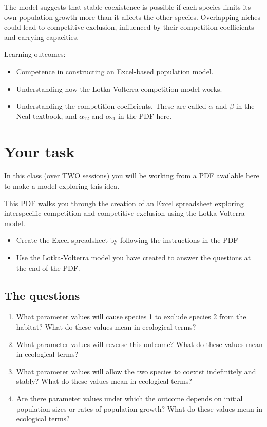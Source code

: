 \documentclass[
  a4paper]{book}
\providecommand{\tightlist}{%
  \setlength{\itemsep}{0pt}\setlength{\parskip}{0pt}}
\begin{document}
The model suggests that stable coexistence is possible if each species limits its own population growth more than it affects the other species. Overlapping niches could lead to competitive exclusion, influenced by their competition coefficients and carrying capacities.

\begin{do-something}
Learning outcomes:

\begin{itemize}
\tightlist
\item
  Competence in constructing an Excel-based population model.
\item
  Understanding how the Lotka-Volterra competition model works.
\item
  Understanding the competition coefficients. These are called
  \(\alpha\) and \(\beta\) in the Neal textbook, and \(\alpha_{12}\) and
  \(\alpha_{21}\) in the PDF here.
\end{itemize}
\end{do-something}

\section{Your task}\label{your-task-14}

In this class (over TWO sessions) you will be working from a PDF available \href{https://www.dropbox.com/s/oukr39oq0rsn8il/9.\%20Interspecific\%20Competition\%20and\%20Competitive\%20Exclusion.pdf?dl=1}{here} to make a model exploring this idea.

This PDF walks you through the creation of an Excel spreadsheet exploring interspecific competition and competitive exclusion using the Lotka-Volterra model.

\begin{itemize}
\tightlist
\item
  Create the Excel spreadsheet by following the instructions in the PDF
\item
  Use the Lotka-Volterra model you have created to answer the questions at the end of the PDF.
\end{itemize}

\subsection{The questions}\label{the-questions}

\begin{enumerate}
\def\labelenumi{\arabic{enumi}.}
\tightlist
\item
  What parameter values will cause species 1 to exclude species 2 from the habitat? What do these values mean in ecological terms?
\item
  What parameter values will reverse this outcome? What do these values mean in ecological terms?
\item
  What parameter values will allow the two species to coexist indefinitely and stably? What do these values mean in ecological terms?
\item
  Are there parameter values under which the outcome depends on initial population sizes or rates of population growth? What do these values mean in ecological terms?
\end{enumerate}
\end{document}
